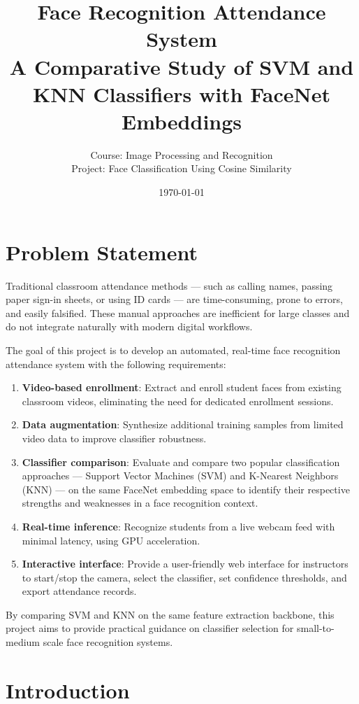\documentclass[12pt,a4paper]{article}
\title{\textbf{Face Recognition Attendance System}\\[0.5cm]
\large{A Comparative Study of SVM and KNN Classifiers with FaceNet Embeddings}}
\author{
    Course: Image Processing and Recognition \\
    Project: Face Classification Using Cosine Similarity
}
\date{\today}
\begin{document}
\maketitle
\thispagestyle{empty}
\newpage

\tableofcontents
\newpage

\section{Problem Statement}
\label{sec:problem}

Traditional classroom attendance methods --- such as calling names, passing paper sign-in sheets, or using ID cards --- are time-consuming, prone to errors, and easily falsified. These manual approaches are inefficient for large classes and do not integrate naturally with modern digital workflows.

The goal of this project is to develop an automated, real-time face recognition attendance system with the following requirements:

\begin{enumerate}
    \item \textbf{Video-based enrollment}: Extract and enroll student faces from existing classroom videos, eliminating the need for dedicated enrollment sessions.
    \item \textbf{Data augmentation}: Synthesize additional training samples from limited video data to improve classifier robustness.
    \item \textbf{Classifier comparison}: Evaluate and compare two popular classification approaches --- Support Vector Machines (SVM) and K-Nearest Neighbors (KNN) --- on the same FaceNet embedding space to identify their respective strengths and weaknesses in a face recognition context.
    \item \textbf{Real-time inference}: Recognize students from a live webcam feed with minimal latency, using GPU acceleration.
    \item \textbf{Interactive interface}: Provide a user-friendly web interface for instructors to start/stop the camera, select the classifier, set confidence thresholds, and export attendance records.
\end{enumerate}

By comparing SVM and KNN on the same feature extraction backbone, this project aims to provide practical guidance on classifier selection for small-to-medium scale face recognition systems.

\section{Introduction}
\label{sec:intro}
\end{document}
